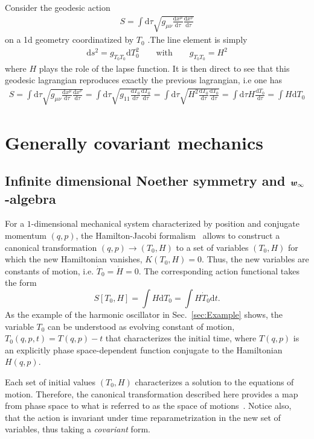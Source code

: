 \documentclass[onecolumn,notitlepage,superscriptaddress, nofootinbib,nobibnotes, aps,prd,10pt]{revtex4-1}%
\def\be{\begin{eqnarray}}
\def\ee{\end{eqnarray}}
\def\dd{\mathrm{d}}
\begin{document}
Consider the geodesic action
    \be
    S = \int \dd{\tau} \sqrt{g_{\mu\nu} \frac{\dd{ x^{\mu}}}{\dd{ \tau}} \frac{\dd{ x^{\nu}}}{\dd{ \tau} }} 
    \ee
    on a 1d geometry coordinatized by $T_0$ .The line element is simply
    \be
    \dd s^2 = g_{T_0 T_0} \dd T^2_0 \qquad \text{with} \qquad g_{T_0 T_0} = H^2
    \ee
    where $H$ plays the role of the lapse function. It is then direct to see that this geodesic lagrangian reproduces exactly the previous lagrangian, i.e one has
    \be
    S = \int \dd{\tau} \sqrt{g_{\mu\nu} \frac{\dd{ x^{\mu}}}{\dd{ \tau}} \frac{\dd{ x^{\nu}}}{\dd{ \tau} }} =  \int \dd{\tau} \sqrt{g_{11} \frac{\dd{ T_0}}{\dd{ \tau}} \frac{\dd{ T_0}}{\dd{ \tau} }} =  \int \dd{\tau} \sqrt{H^2 \frac{\dd{ T_0}}{\dd{ \tau}} \frac{\dd{ T_0}}{\dd{ \tau} }} =  \int \dd{\tau} H\frac{\dd{ T_0}}{\dd{ \tau}} =  \int  H \dd{ T_0}
    \ee
    
    
    \section{Generally covariant mechanics}

\subsection{Infinite dimensional Noether symmetry and  $\text{\textbf{\textit{w}}}_{\mathbf{\infty}}$-algebra}\label{sec:Hidden Noether symmetry}



For a $1$-dimensional mechanical system characterized by position and conjugate momentum $(q,p)$, the Hamilton-Jacobi formalism~\cite{Goldstein1980} allows to construct a canonical transformation $(q,p)\rightarrow (T_0,H)$ to a set of variables $(T_0,H)$ for which the new Hamiltonian vanishes,  $K(T_0,H) = 0$. Thus, the new variables are constants of motion, i.e. $\dot{T}_0 = \dot{H} = 0$. The corresponding action functional takes the form
%
\begin{equation}\label{eq:action}
S[T_0,H] = \int H\dd{T}_0 = \int H\dot{T}_0\dd{t}.
\end{equation}
%
As the example of the harmonic oscillator in Sec.~\ref{sec:Example} shows, the variable $T_0$ can be understood as evolving constant of motion, $T_0(q,p,t)= T(q,p)-t$ that characterizes the initial time, where $T(q,p)$ is an explicitly phase space-dependent function conjugate to the Hamiltonian $H(q,p)$. 

Each set of initial values $(T_0,H)$ characterizes a solution to the equations of motion. Therefore, the canonical transformation described here provides a map from phase space to what is referred to as the space of motions~\cite{Woodhouse1992,Rovelli:2001bq}. Notice also, that the action is invariant under time reparametrization in the new set of variables, thus taking a \textit{covariant} form. 
\end{document}
